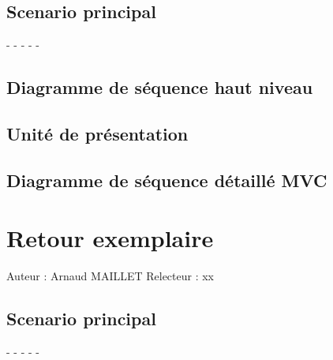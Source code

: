 \documentclass[a4paper,10pt]{report}
\begin{document}
\bigskip
\section*{Scenario principal}
\begin{flushleft}
-
-
-
-
-
\end{flushleft}

\bigskip

\section*{Diagramme de séquence haut niveau}

\newpage

\section*{Unité de présentation}

\section*{Diagramme de séquence détaillé MVC}

\newpage


\chapter*{Retour exemplaire}

Auteur : Arnaud MAILLET
Relecteur : xx

\bigskip
\section*{Scenario principal}
\begin{flushleft}
-
-
-
-
-
\end{flushleft}
\end{document}
